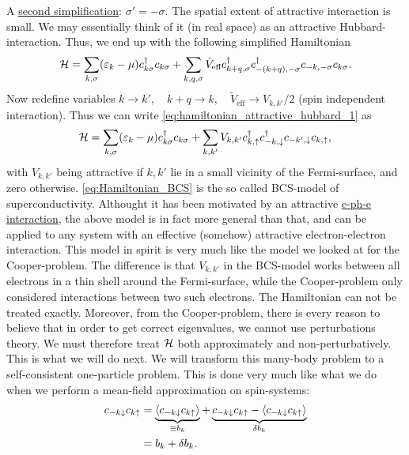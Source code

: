 A \underline{second simplification}: $\sigma' = -\sigma$. The spatial extent of attractive interaction is small. We may essentially think of it (in real space) as an attractive Hubbard-interaction. Thus, we end up with the following simplified Hamiltonian
\begin{equation}
\label{eq:hamiltonian_attractive_hubbard_1}
\mathcal{H} = \sum_{k,\sigma}(\varepsilon_k - \mu)c^{\dagger}_{k\sigma}c_{k\sigma} + \sum_{k,q,\sigma}\tilde{V}_{\text{eff}}c^{\dagger}_{k+q, \sigma}c^{\dagger}_{-(k+q), -\sigma}c_{-k, -\sigma}c_{k\sigma}.
\end{equation}
Now redefine variables $k\rightarrow k', \quad k+q\rightarrow k, \quad \tilde{V}_{\text{eff}}\rightarrow V_{k,k'}/2$ (spin independent interaction). Thus we can write \cref{eq:hamiltonian_attractive_hubbard_1} as
\begin{equation}
\label{eq:Hamiltonian_BCS}
	\mathcal{H} = \sum_{k,\sigma}(\varepsilon_k - \mu)c^{\dagger}_{k\sigma}c_{k\sigma} + \sum_{k,k'}V_{k,k'}c^{\dagger}_{k,\uparrow}c^{\dagger}_{-k, \downarrow}c_{-k',\downarrow}c_{k,\uparrow},
\end{equation}
with $V_{k,k'}$ being attractive if $k,k'$ lie in a small vicinity of the Fermi-surface, and zero otherwise. 
\cref{eq:Hamiltonian_BCS} is the so called BCS-model of superconductivity. Althought it has been motivated by an attractive \underline{e-ph-e interaction}, the above model is in fact more general than that, and can be applied to any system with an effective (somehow) attractive electron-electron interaction.
This model in spirit is very much like the model we looked at for the Cooper-problem. The difference is that $V_{k,k'}$ in the BCS-model works between all electrons in a thin shell around the Fermi-surface, while the Cooper-problem only considered interactions between two such electrons.
The Hamiltonian can not be treated exactly. Moreover, from the Cooper-problem, there is every reason to believe that in order to get correct eigenvalues, we cannot use perturbations theory. We must therefore treat $\mathcal{H}$ both approximately and non-perturbatively. This is what we will do next.
We will transform this many-body problem to a self-consistent one-particle problem. This is done very much like what we do when we perform a mean-field approximation on spin-systems:
\begin{align}
\label{eq:mft_bcs}
\begin{split}
	c_{-k\downarrow}c_{k\uparrow} &= \underbrace{\ev{	c_{-k\downarrow}c_{k\uparrow}}}_{\equiv b_k} + \underbrace{c_{-k\downarrow}c_{k\uparrow} - \ev{	c_{-k\downarrow}c_{k\uparrow}}}_{\delta b_k} \\
	&= b_k + \delta b_k.
\end{split}
\end{align}
